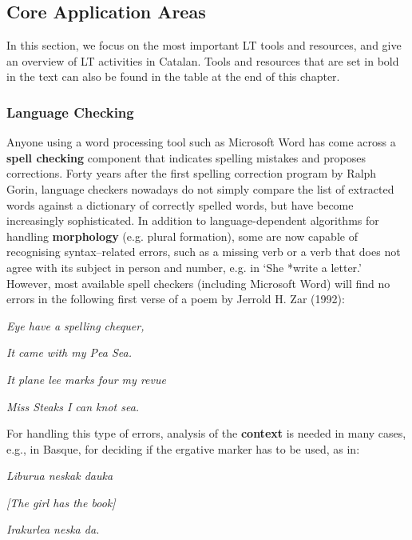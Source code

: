 \begin{multicols}{2}
\subsection{Core Application Areas}

    In this section, we focus on the most important LT tools and resources, and give an overview of LT activities in Catalan. Tools and resources that are set in bold in the text can also be found in the table at the end of this chapter.

\subsubsection{Language Checking}
    Anyone using a word processing tool such as Microsoft Word has come across a \textbf{spell checking} component that indicates spelling mistakes and proposes corrections. Forty years after the first spelling correction program by Ralph Gorin, language checkers nowadays do not simply compare the list of extracted words against a dictionary of correctly spelled words, but have become increasingly sophisticated. In addition to language-dependent algorithms for handling \textbf{morphology} (e.g. plural formation), some are now capable of recognising syntax–related errors, such as a missing verb or a verb that does not agree with its subject in person and number, e.g. in ‘She *write a letter.’ However, most available spell checkers (including Microsoft Word) will find no errors in the following first verse of a poem by Jerrold H. Zar (1992):
 
\hspace{10pt}\textit{Eye have a spelling chequer,}

\hspace{10pt}\textit{It came with my Pea Sea.}

\hspace{10pt}\textit{It plane lee marks four my revue}

\hspace{10pt}\textit{Miss Steaks I can knot sea.}

For handling this type of errors, analysis of the \textbf{context} is needed in many cases, e.g., in Basque, for deciding if the ergative marker has to be used, as in:

\hspace{10pt}\textit{Liburua neskak dauka }

\hspace{10pt}\textit{[The girl has the book]}

\hspace{10pt}\textit{Irakurlea neska da.}


\end{multicols}
